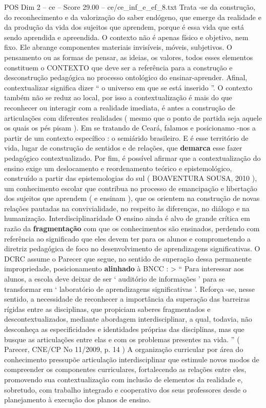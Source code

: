 \begin{textsample}{POS Dim 2 – ce – Score 29.00 – ce/ce\_inf\_e\_ef\_8.txt}
Trata -se da construção, do reconhecimento e da valorização do saber endógeno, que emerge da realidade e da produção da vida dos sujeitos que aprendem, porque é essa vida que está sendo aprendida e apreendida.
O contexto não é apenas físico e objetivo, nem fixo.
Ele abrange componentes materiais invisíveis, móveis, subjetivos.
O pensamento ou as formas de pensar, as ideias, os valores, todos esses elementos constituem o CONTEXTO que deve ser a referência para a construção e desconstrução pedagógica no processo ontológico do ensinar-aprender.
Afinal, contextualizar significa dizer “ o universo em que se está inserido ”.
O contexto também não se reduz ao local, por isso a contextualização é mais do que reconhecer ou interagir com a realidade imediata, é antes a construção de articulações com diferentes realidades ( mesmo que o ponto de partida seja aquele os quais os pés pisam ).
Em se tratando de Ceará, falamos e posicionamo -nos a partir de um contexto específico : o semiárido brasileiro.
E é esse território de vida, lugar de construção de sentidos e de relações, que \textbf{demarca} esse fazer pedagógico contextualizado.
Por fim, é possível afirmar que a contextualização do ensino exige um deslocamento e reordenamento teórico e epistemológico, construído a partir das epistemologias do sul ( BOAVENTURA SOUSA, 2010 ), um conhecimento escolar que contribua no processo de emancipação e libertação dos sujeitos que aprendem ( e ensinam ), que os orientem na construção de novas relações pautadas na convivialidade, no respeito às diferenças, no diálogo e na humanização.
Interdisciplinaridade O ensino ainda é alvo de grande crítica em razão da \textbf{fragmentação} com que os conhecimentos são ensinados, perdendo com referência ao significado que eles devem ter para os alunos e comprometendo a diretriz pedagógica de foco no desenvolvimento de aprendizagens significativas.
O DCRC assume o Parecer que segue, no sentido de superação dessa permanente impropriedade, posicionamento \textbf{alinhado} à BNCC : > “ Para interessar aos alunos, a escola deve deixar de ser ‘ auditório de informações ’ para se transformar em ‘ laboratório de aprendizagens significativas ’.
Reforça -se, nesse sentido, a necessidade de reconhecer a importância da superação das barreiras rígidas entre as disciplinas, que propiciam saberes fragmentados e descontextualizados, mediante abordagem interdisciplinar, a qual, todavia, não desconheça as especificidades e identidades próprias das disciplinas, mas que busque as articulações entre elas e com os problemas presentes na vida. ” ( Parecer, CNE/CP No 11/2009, p. 14 ) A organização curricular por área do conhecimento pressupõe articulação interdisciplinar que estimule novos modos de compreender os componentes curriculares, fortalecendo as relações entre eles, promovendo sua contextualização com inclusão de elementos da realidade e, sobretudo, com trabalho integrado e cooperativo dos seus professores desde o planejamento à execução dos planos de ensino.

\end{textsample}
